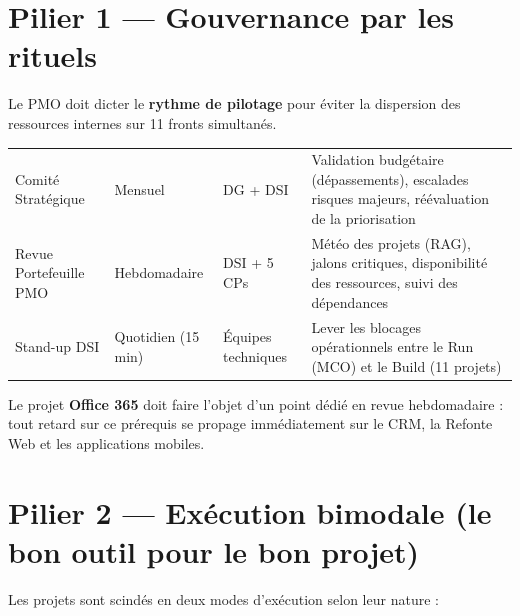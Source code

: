 \documentclass[11pt,a4paper,oneside]{report}
\begin{document}
\section{Pilier 1 --- Gouvernance par les rituels}

Le PMO doit dicter le \textbf{rythme de pilotage} pour éviter la dispersion des ressources internes sur 11 fronts simultanés.

\vspace{4pt}
\begin{center}
\renewcommand{\arraystretch}{1.5}
\begin{tabularx}{\textwidth}{C{3cm} C{2.5cm} L{4cm} L{5cm}}
\toprule
{}
 &  &  &  \\
\midrule
Comité Stratégique & Mensuel & DG + DSI & Validation budgétaire (dépassements), escalades risques majeurs, réévaluation de la priorisation \\
Revue Portefeuille PMO & Hebdomadaire & DSI + 5 CPs & Météo des projets (RAG), jalons critiques, disponibilité des ressources, suivi des dépendances \\
Stand-up DSI & Quotidien (15 min) & Équipes techniques & Lever les blocages opérationnels entre le Run (MCO) et le Build (11 projets) \\
\bottomrule
\end{tabularx}
\end{center}

\begin{alert}
Le projet \textbf{Office 365} doit faire l'objet d'un point dédié en revue hebdomadaire : tout retard sur ce prérequis se propage immédiatement sur le CRM, la Refonte Web et les applications mobiles.
\end{alert}

\section{Pilier 2 --- Exécution bimodale (le bon outil pour le bon projet)}

Les projets sont scindés en deux modes d'exécution selon leur nature :
\end{document}
